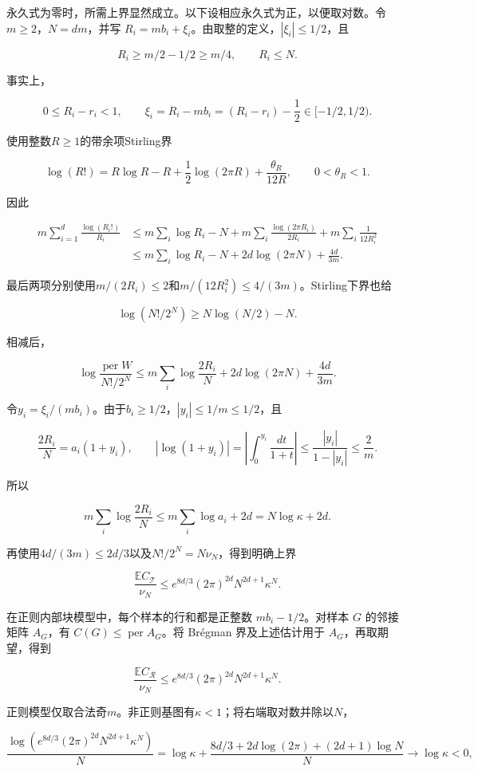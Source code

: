 \documentclass[11pt,a4paper]{article}
\begin{document}
永久式为零时，所需上界显然成立。以下设相应永久式为正，以便取对数。令 \(m\ge2\)，\(N=dm\)，并写 \(R_i=mb_i+\xi_i\)。由取整的定义，\(|\xi_i|\le1/2\)，且

\[
R_i\ge m/2-1/2\ge m/4,\qquad R_i\le N.
\]

事实上，

\[
0\le R_i-r_i<1,\qquad
\xi_i=R_i-mb_i=(R_i-r_i)-\frac12
\in[-1/2,1/2).
\]

使用整数\(R\ge1\)的带余项Stirling界

\[
\log(R!)=R\log R-R+\frac12\log(2\pi R)
+\frac{\theta_R}{12R},\qquad 0<\theta_R<1.
\]

因此

\[
\begin{aligned}
m\sum_{i=1}^d\frac{\log(R_i!)}{R_i}
&\le m\sum_i\log R_i-N
+m\sum_i\frac{\log(2\pi R_i)}{2R_i}
+m\sum_i\frac1{12R_i^2}\\
&\le m\sum_i\log R_i-N
+2d\log(2\pi N)+\frac{4d}{3m}.
\end{aligned}
\]

最后两项分别使用\(m/(2R_i)\le2\)和\(m/(12R_i^2)\le4/(3m)\)。Stirling下界也给

\[
\log(N!/2^N)\ge N\log(N/2)-N.
\]

相减后，

\[
\log\frac{\operatorname{per}W}{N!/2^N}
\le m\sum_i\log\frac{2R_i}{N}
+2d\log(2\pi N)+\frac{4d}{3m}.
\]

令\(y_i=\xi_i/(mb_i)\)。由于\(b_i\ge1/2\)，\(|y_i|\le1/m\le1/2\)，且

\[
\frac{2R_i}{N}=a_i(1+y_i),\qquad
|\log(1+y_i)|
=\left|\int_0^{y_i}\frac{dt}{1+t}\right|
\le\frac{|y_i|}{1-|y_i|}\le\frac2m.
\]

所以

\[
m\sum_i\log\frac{2R_i}{N}
\le m\sum_i\log a_i+2d=N\log\kappa+2d.
\]

再使用\(4d/(3m)\le2d/3\)以及\(N!/2^N=N\nu_N\)，得到明确上界

\[
\frac{\mathbb EC_{\mathcal T}}{\nu_N}
\le e^{8d/3}(2\pi)^{2d}N^{2d+1}\kappa^N.
\]

在正则内部块模型中，每个样本的行和都是正整数 \(mb_i-1/2\)。对样本 \(G\) 的邻接矩阵 \(A_G\)，有 \(C(G)\le\operatorname{per}A_G\)。将 Brégman 界及上述估计用于 \(A_G\)，再取期望，得到

\[
\frac{\mathbb EC_{\mathcal R}}{\nu_N}
\le e^{8d/3}(2\pi)^{2d}N^{2d+1}\kappa^N.
\]

正则模型仅取合法奇\(m\)。非正则基图有\(\kappa<1\)；将右端取对数并除以\(N\)，

\[
\frac{\log(e^{8d/3}(2\pi)^{2d}N^{2d+1}\kappa^N)}{N}
=\log\kappa+
\frac{8d/3+2d\log(2\pi)+(2d+1)\log N}{N}
\longrightarrow\log\kappa<0,
\]
\end{document}
